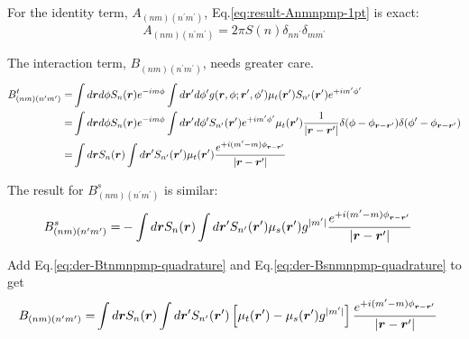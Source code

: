 \documentclass [10pt,letterpaper]{article}
\begin{document}
For the identity term, $A_{(nm)(n^\prime m^\prime)}$, Eq.\eqref{eq:result-Anmnpmp-1pt} is exact:
\begin{equation} \label{eq:result-Anmnpmp-1pt-2nd-time}
	A_{(n m)(n^\prime m^\prime)}
	=
	2\pi S(n)
	\delta_{n n^\prime}
	\delta_{m m^\prime}
\end{equation}

The interaction term, $B_{(nm)(n^\prime m^\prime)}$, needs greater care.
\begin{equation} \label{eq:der-Btnmnpmp-quadrature}
	\begin{split}
		B^t_{(n m)(n^\prime m^\prime)}
		=&
			\int d\vectorsym{r} d\phi
			S_n(\vectorsym{r})
			e^{-i m \phi}
			\int d\vectorsym{r}^\prime d\phi^\prime
			g(\vectorsym{r},\phi;\vectorsym{r}^\prime,\phi^\prime)
			\mu_t(\vectorsym{r}^\prime)
			S_{n^\prime}(\vectorsym{r}^\prime)
			e^{+i m^\prime \phi^\prime}
		\\
		=&
			\int d\vectorsym{r} d\phi
			S_n(\vectorsym{r})
			e^{-i m \phi}
			\int d\vectorsym{r}^\prime d\phi^\prime
			S_{n^\prime}(\vectorsym{r}^\prime)
			e^{+i m^\prime \phi^\prime}
			\mu_t(\vectorsym{r}^\prime)
			\frac{1}{\lvert\vectorsym{r}-\vectorsym{r^\prime}\rvert}
			\delta(\phi-\phi_{\vectorsym{r}-\vectorsym{r}^{\prime}})
			\delta(\phi^\prime-\phi_{\vectorsym{r}-\vectorsym{r}^{\prime}})
		\\
		=&
			\int d\vectorsym{r}
			S_n(\vectorsym{r})
			\int d\vectorsym{r}^\prime
			S_{n^\prime}(\vectorsym{r}^\prime)
			\mu_t(\vectorsym{r}^\prime)
			\frac
			{ e^{+i (m^\prime - m)\phi_{\vectorsym{r}-\vectorsym{r^\prime}}} }
			{\lvert\vectorsym{r}-\vectorsym{r^\prime}\rvert}
	\end{split}
\end{equation}

The result for $B^s_{(nm)(n^\prime m^\prime)}$ is similar:
\begin{equation} \label{eq:der-Bsnmnpmp-quadrature}
	\begin{split} 
		B^s_{(nm)(n^\prime m^\prime)}
		=& 
			-
			\int d\vectorsym{r}
			S_n(\vectorsym{r})
			\int d\vectorsym{r}^\prime
			S_{n^\prime}(\vectorsym{r}^\prime)
			\mu_s(\vectorsym{r}^\prime)
			g^{\lvert m^\prime \rvert}
			\frac
			{ e^{+i (m^\prime - m)\phi_{\vectorsym{r}-\vectorsym{r^\prime}}} }
			{\lvert\vectorsym{r}-\vectorsym{r^\prime}\rvert}
	\end{split}
\end{equation}

Add Eq.\eqref{eq:der-Btnmnpmp-quadrature} and Eq.\eqref{eq:der-Bsnmnpmp-quadrature} to get
\begin{equation} \label{eq:der-Bnmnpmp-quadrature}
	\begin{split} 
		B_{(nm)(n^\prime m^\prime)}
		=& 
			\int d\vectorsym{r}
			S_n(\vectorsym{r})
			\int d\vectorsym{r}^\prime
			S_{n^\prime}(\vectorsym{r}^\prime)
			\left[
				\mu_t(\vectorsym{r}^\prime)
				-
				\mu_s(\vectorsym{r}^\prime)
				g^{\lvert m^\prime \rvert}
			\right]
			\frac
			{ e^{+i (m^\prime - m)\phi_{\vectorsym{r}-\vectorsym{r^\prime}}} }
			{\lvert\vectorsym{r}-\vectorsym{r^\prime}\rvert}
	\end{split}
\end{equation}
\end{document}
